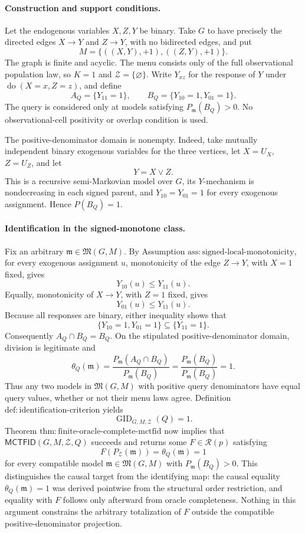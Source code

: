 \paragraph{Construction and support conditions.}
Let the endogenous variables \(X,Z,Y\) be binary.  Take \(G\) to have precisely the directed edges \(X\to Y\) and \(Z\to Y\), with no bidirected edges, and put
\[
 M=\{((X,Y),+1),((Z,Y),+1)\}.
\]
The graph is finite and acyclic.  The menu consists only of the full observational population law, so \(K=1\) and \(\mathcal Z=\{\varnothing\}\).  Write \(Y_{xz}\) for the response of \(Y\) under \(\operatorname{do}(X=x,Z=z)\), and define
\[
 A_Q=\{Y_{11}=1\},
 \qquad
 B_Q=\{Y_{10}=1,Y_{01}=1\}.
\]
The query is considered only at models satisfying \(P_{\mathfrak m}(B_Q)>0\).  No observational-cell positivity or overlap condition is used.

The positive-denominator domain is nonempty.  Indeed, take mutually independent binary exogenous variables for the three vertices, let \(X=U_X\), \(Z=U_Z\), and let
\[
 Y=X\lor Z.
\]
This is a recursive semi-Markovian model over \(G\), its \(Y\)-mechanism is nondecreasing in each signed parent, and \(Y_{10}=Y_{01}=1\) for every exogenous assignment.  Hence \(P(B_Q)=1\).

\paragraph{Identification in the signed-monotone class.}
Fix an arbitrary \(\mathfrak m\in\mathfrak M(G,M)\).  By Assumption \(\mathrm{ass:signed\text{-}local\text{-}monotonicity}\), for every exogenous assignment \(u\), monotonicity of the edge \(Z\to Y\), with \(X=1\) fixed, gives
\[
 Y_{10}(u)\le Y_{11}(u).
\]
Equally, monotonicity of \(X\to Y\), with \(Z=1\) fixed, gives
\[
 Y_{01}(u)\le Y_{11}(u).
\]
Because all responses are binary, either inequality shows that
\[
 \{Y_{10}=1,Y_{01}=1\}\subseteq\{Y_{11}=1\}.
\]
Consequently \(A_Q\cap B_Q=B_Q\).  On the stipulated positive-denominator domain, division is legitimate and
\[
 \theta_Q(\mathfrak m)
 =\frac{P_{\mathfrak m}(A_Q\cap B_Q)}{P_{\mathfrak m}(B_Q)}
 =\frac{P_{\mathfrak m}(B_Q)}{P_{\mathfrak m}(B_Q)}
 =1.
\]
Thus any two models in \(\mathfrak M(G,M)\) with positive query denominators have equal query values, whether or not their menu laws agree.  Definition \(\mathrm{def:identification\text{-}criterion}\) yields
\[
 \operatorname{GID}_{G,M,\mathcal Z}(Q)=1.
\]
Theorem \(\mathrm{thm:finite\text{-}oracle\text{-}complete\text{-}mctfid}\) now implies that \(\mathsf{MCTFID}(G,M,\mathcal Z,Q)\) succeeds and returns some \(F\in\mathcal R(p)\) satisfying
\[
 F(P_{\mathcal Z}(\mathfrak m))=\theta_Q(\mathfrak m)=1
\]
for every compatible model \(\mathfrak m\in\mathfrak M(G,M)\) with \(P_{\mathfrak m}(B_Q)>0\).  This distinguishes the causal target from the identifying map: the causal equality \(\theta_Q(\mathfrak m)=1\) was derived pointwise from the structural order restriction, and equality with \(F\) follows only afterward from oracle completeness.  Nothing in this argument constrains the arbitrary totalization of \(F\) outside the compatible positive-denominator projection.

